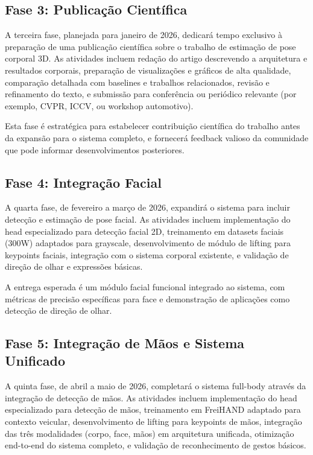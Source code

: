 \documentclass[12pt, a4paper]{article}
\begin{document}
\subsection{Fase 3: Publicação Científica}

A terceira fase, planejada para janeiro de 2026, dedicará tempo exclusivo à preparação de uma publicação científica sobre o trabalho de estimação de pose corporal 3D. As atividades incluem redação do artigo descrevendo a arquitetura e resultados corporais, preparação de visualizações e gráficos de alta qualidade, comparação detalhada com baselines e trabalhos relacionados, revisão e refinamento do texto, e submissão para conferência ou periódico relevante (por exemplo, CVPR, ICCV, ou workshop automotivo).

Esta fase é estratégica para estabelecer contribuição científica do trabalho antes da expansão para o sistema completo, e fornecerá feedback valioso da comunidade que pode informar desenvolvimentos posteriores.

\subsection{Fase 4: Integração Facial}

A quarta fase, de fevereiro a março de 2026, expandirá o sistema para incluir detecção e estimação de pose facial. As atividades incluem implementação do head especializado para detecção facial 2D, treinamento em datasets faciais (300W) adaptados para grayscale, desenvolvimento de módulo de lifting para keypoints faciais, integração com o sistema corporal existente, e validação de direção de olhar e expressões básicas.

A entrega esperada é um módulo facial funcional integrado ao sistema, com métricas de precisão específicas para face e demonstração de aplicações como detecção de direção de olhar.

\subsection{Fase 5: Integração de Mãos e Sistema Unificado}

A quinta fase, de abril a maio de 2026, completará o sistema full-body através da integração de detecção de mãos. As atividades incluem implementação do head especializado para detecção de mãos, treinamento em FreiHAND adaptado para contexto veicular, desenvolvimento de lifting para keypoints de mãos, integração das três modalidades (corpo, face, mãos) em arquitetura unificada, otimização end-to-end do sistema completo, e validação de reconhecimento de gestos básicos.
\end{document}
